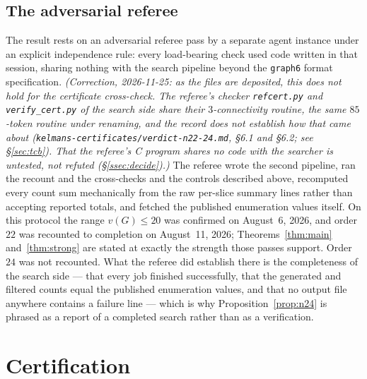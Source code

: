 \documentclass[11pt]{amsart}
\newcommand{\vv}{v}
\theoremstyle{plain}
\theoremstyle{definition}
\theoremstyle{remark}
\begin{document}
\subsection{The adversarial referee}\label{ssec:referee}
The result rests on an adversarial referee pass by a separate agent
instance under an explicit independence rule: every load-bearing check
used code written in that session, sharing nothing with the search
pipeline beyond the \texttt{graph6} format specification. \emph{(Correction,
2026-11-25: as the files are deposited, this does not hold for the
certificate cross-check. The referee's checker \texttt{refcert.py} and
\texttt{verify\_cert.py} of the search side share their $3$-connectivity
routine, the same $85$-token routine under renaming, and the record does not
establish how that came about
(\texttt{kelmans-certificates/verdict-n22-24.md}, \S6.1 and \S6.2; see
\S\ref{sec:tcb}). That the referee's C program shares no code with the
searcher is untested, not refuted (\S\ref{ssec:decide}).)} The referee
wrote the second pipeline, ran the recount and the cross-checks and the
controls described above, recomputed every count sum mechanically from
the raw per-slice summary lines rather than accepting reported totals,
and fetched the published enumeration values itself. On this protocol the
range $\vv(G)\le 20$ was confirmed on August~6, 2026, and order $22$ was
recounted to completion on August~11, 2026; Theorems~\ref{thm:main}
and~\ref{thm:strong} are stated at exactly the strength those passes
support. Order $24$ was not recounted. What the referee did establish
there is the completeness of the search side --- that every job finished
successfully, that the generated and filtered counts equal the published
enumeration values, and that no output file anywhere contains a failure
line --- which is why Proposition~\ref{prop:n24} is phrased as a report
of a completed search rather than as a verification.

\section{Certification}\label{sec:certification}
\end{document}
